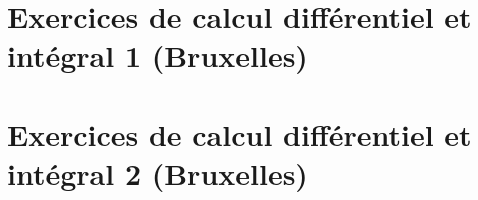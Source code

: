 



\chapter{Exercices de calcul différentiel et intégral 1 (Bruxelles)}


 
\chapter{Exercices de calcul différentiel et intégral 2 (Bruxelles)}






 


